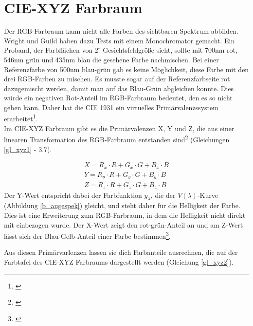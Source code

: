  

\section{CIE-XYZ Farbraum} \label{sec_xyz}

Der RGB-Farbraum kann nicht alle Farben des sichtbaren Spektrum abbilden. Wright und Guild haben dazu Tests mit einem Monochromator gemacht. Ein Proband, der Farbflächen von $2^\circ$ Gesichtsfeldgröße sieht, sollte mit 700nm rot, 546nm grün und 435nm blau die gesehene Farbe nachmischen. Bei einer Referenzfarbe von 500nm blau-grün gab es keine Möglichkeit, diese Farbe mit den drei RGB-Farben zu mischen. Es musste sogar auf der Referenzfarbseite rot dazugemischt werden, damit man auf das Blau-Grün abgleichen konnte. Dies würde ein negativen Rot-Anteil im RGB-Farbraum bedeutet, den es so nicht geben kann. Daher hat die CIE 1931 ein virtuelles Primärvalenzssystem erarbeitet\footnote{\cite[77]{greule}}.\\
Im CIE-XYZ Farbraum gibt es die Primärvalenzen X, Y und Z, die aus einer linearen Transformation des RGB-Farbraum entstanden sind\footnote{\cite[76-77]{greule}} (Gleichungen  \ref{gl_xyz1} - 3.7).

\begin{eqnarray}\label{gl_xyz1}
		X = R_{x}\cdot R + G_{x}\cdot G + B_{x}\cdot B\\
		Y = R_{y}\cdot R + G_{y}\cdot G + B_{y}\cdot B\\
		Z = R_{z}\cdot R + G_{z}\cdot G + B_{z}\cdot B
\end{eqnarray}
Der Y-Wert entspricht dabei der Farbfunktion $y_{\lambda}$, die der $V(\lambda)$-Kurve (Abbildung \ref{b_augespek}) gleicht, und steht daher für die Helligkeit der Farbe. Dies ist eine Erweiterung zum RGB-Farbraum, in dem die Helligkeit nicht direkt mit einbezogen wurde. Der X-Wert zeigt den rot-grün-Anteil an und am Z-Wert lässt sich der Blau-Gelb-Anteil einer Farbe bestimmen\footnote{\cite[72]{mueller}}. 


Aus diesen Primärvarlenzen lassen sie dich Farbanteile ausrechnen, die auf der Farbtafel des CIE-XYZ Farbraums dargestellt werden (Gleichung \ref{gl_xyz2}). 
 

